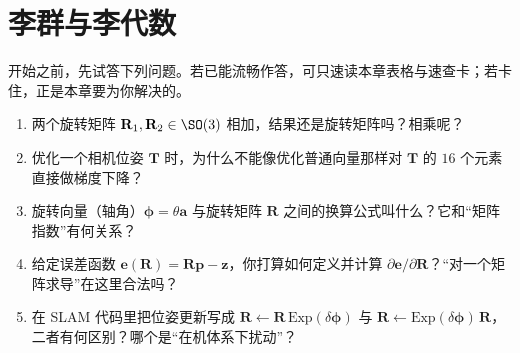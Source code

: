 \chapter{李群与李代数}
\label{ch:lie}


\begin{practice}[前置自测]
开始之前，先试答下列问题。若已能流畅作答，可只速读本章表格与速查卡；若卡住，正是本章要为你解决的。
\begin{enumerate}
  \item 两个旋转矩阵 $\mathbf{R}_1,\mathbf{R}_2\in\SO(3)$ 相加，结果还是旋转矩阵吗？相乘呢？
  \item 优化一个相机位姿 $\mathbf{T}$ 时，为什么不能像优化普通向量那样对 $\mathbf{T}$ 的 $16$ 个元素直接做梯度下降？
  \item 旋转向量（轴角）$\boldsymbol{\phi}=\theta\mathbf{a}$ 与旋转矩阵 $\mathbf{R}$ 之间的换算公式叫什么？它和“矩阵指数”有何关系？
  \item 给定误差函数 $\mathbf{e}(\mathbf{R})=\mathbf{R}\mathbf{p}-\mathbf{z}$，你打算如何定义并计算 $\partial\mathbf{e}/\partial\mathbf{R}$？“对一个矩阵求导”在这里合法吗？
  \item 在 SLAM 代码里把位姿更新写成 $\mathbf{R}\leftarrow\mathbf{R}\,\mathrm{Exp}(\delta\boldsymbol{\phi})$ 与 $\mathbf{R}\leftarrow\mathrm{Exp}(\delta\boldsymbol{\phi})\,\mathbf{R}$，二者有何区别？哪个是“在机体系下扰动”？
\end{enumerate}
\end{practice}

